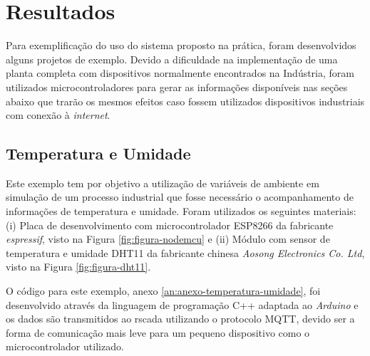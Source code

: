 \chapter{Resultados}
\label{chap:resultados}

Para exemplificação do uso do sistema proposto na prática, foram desenvolvidos alguns projetos de exemplo. Devido a dificuldade na implementação de uma planta completa com dispositivos normalmente encontrados na Indústria, foram utilizados microcontroladores para gerar as informações disponíveis nas seções abaixo que trarão os mesmos efeitos caso fossem utilizados dispositivos industriais com conexão à \textit{internet}.

\section{Temperatura e Umidade}
\label{sec:temperatura-umidade}

Este exemplo tem por objetivo a utilização de variáveis de ambiente em simulação de um processo industrial que fosse necessário o acompanhamento de informações de temperatura e umidade. Foram utilizados os seguintes materiais: (i) Placa de desenvolvimento com microcontrolador ESP8266 da fabricante \textit{espressif}, visto na Figura \ref{fig:figura-nodemcu} e (ii) Módulo com sensor de temperatura e umidade DHT11 da fabricante chinesa \textit{Aosong Electronics Co. Ltd}, visto na Figura \ref{fig:figura-dht11}.

O código para este exemplo, anexo \ref{an:anexo-temperatura-umidade}, foi desenvolvido através da linguagem de programação C++ adaptada ao \textit{Arduino} e os dados são transmitidos ao rscada utilizando o protocolo \gls{MQTT}, devido ser a forma de comunicação mais leve para um pequeno dispositivo como o microcontrolador utilizado.

        \begin{figure}[!h]
    	\end{figure}
    	
